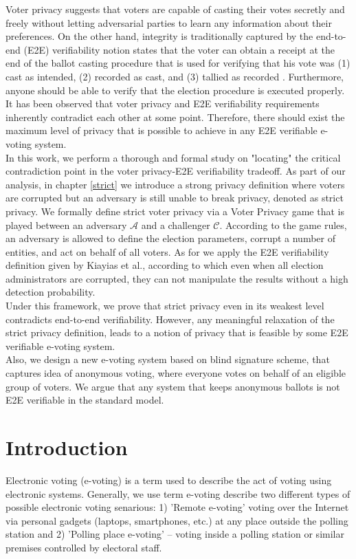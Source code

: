 \documentclass[12pt]{article}
\begin{document}
Voter privacy suggests that voters are capable of casting their votes secretly and freely without letting adversarial parties to learn any information about their preferences. On the other hand, integrity is traditionally captured by the end-to-end (E2E) verifiability \cite{Benaloh2011} notion states that the voter can obtain a receipt at the end of the ballot casting procedure that is used for verifying that his vote was (1) cast as intended, (2) recorded as cast, and (3) tallied as recorded \cite{Kiayias2015a}. Furthermore, anyone should be able to verify that the election procedure is executed properly. It has been observed that voter privacy and E2E verifiability requirements inherently contradict each other at some point.  Therefore, there should exist the maximum level of privacy that is possible to achieve in any E2E verifiable e-voting system.\\

In this work, we perform a thorough and formal study on "locating" the critical contradiction point in the voter privacy-E2E verifiability tradeoff.  As part of our analysis, in chapter  \ref{strict} we introduce a strong privacy definition where voters are corrupted but an adversary is still unable to break privacy, denoted as strict privacy. We formally define strict voter privacy via a Voter Privacy game that is played between an adversary $\mathcal{A}$ and a challenger $\mathcal{C}$. According to the game rules, an adversary is allowed to define the election parameters, corrupt a number of entities, and act on behalf of all voters. As for we apply the E2E verifiability definition given by Kiayias et al., according to which even when all election administrators are corrupted, they can not manipulate the results without a high detection probability.\\

Under this framework, we prove that strict privacy even in its weakest level contradicts end-to-end verifiability. However, any meaningful relaxation of the strict privacy definition, leads to a notion of privacy that is feasible by some E2E verifiable e-voting system. \\

Also, we design a new e-voting system based on blind signature scheme, that captures idea of anonymous voting, where everyone votes on behalf of an eligible group of voters. We argue that any system that keeps anonymous ballots is not E2E verifiable in the standard model. 
 
\section{Introduction}
Electronic voting (e-voting) is a term used to describe the act of voting using electronic systems. Generally, we use term e-voting describe two different types of possible electronic voting senarious:  1) 'Remote e-voting' voting over the Internet via personal gadgets (laptops, smartphones, etc.) at any place outside the polling station and  2) 'Polling place e-voting' -- voting inside a polling station or similar premises controlled by electoral staff. \\
\end{document}
